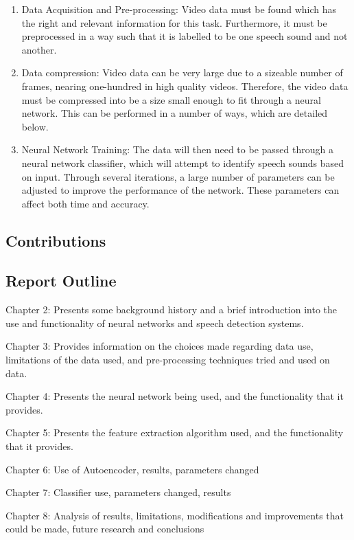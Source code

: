 \documentclass[12pt,twoside]{report}
\begin{document}
\begin{enumerate}
	\item Data Acquisition and Pre-processing: Video data must be found which has the right and relevant information for this task. Furthermore, it must be preprocessed in a way such that it is labelled to be one speech sound and not another.
	\item Data compression:  Video data can be very large due to a sizeable number of frames, nearing one-hundred in high quality videos. Therefore, the video data must be compressed into be a size small enough to fit through a neural network. This can be performed in a number of ways, which are detailed below. 
	\item Neural Network Training: The data will then need to be passed through a neural network classifier, which will attempt to identify speech sounds based on input. Through several iterations, a large number of parameters can be adjusted to improve the performance of the network. These parameters can affect both time and accuracy.

\end{enumerate}

	\subsection{Contributions}
	\subsection{Report Outline}
Chapter 2: Presents some background history and a brief introduction into the use and functionality of neural networks and speech detection systems. \par
Chapter 3: Provides information on the choices made regarding data use, limitations of the data used, and pre-processing techniques tried and used on data. \par
Chapter 4: Presents the neural network being used, and the functionality that it provides. \par
Chapter 5: Presents the feature extraction algorithm used, and the functionality that it provides. \par
Chapter 6: Use of Autoencoder, results, parameters changed \par
Chapter 7: Classifier use, parameters changed, results \par
Chapter 8: Analysis of results, limitations, modifications and improvements that could be made, future research and conclusions \par
	
\end{document}
